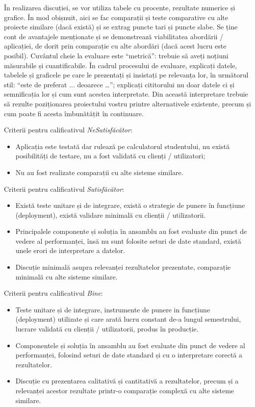 \documentclass[12pt,a4paper]{report}
\newcommand{\worktype}[1]{[\textit{#1}] }
\newcommand{\dezvoltare}{\worktype{Dezvoltare de produs}}
\newcommand{\cercetare}{\worktype{Cercetare}}
\newcommand{\ambele}{\worktype{Ambele}}
\begin{document}
În realizarea discuției, se vor utiliza tabele cu procente, rezultate numerice și grafice. În mod obișnuit, aici se fac comparații și teste comparative cu alte proiecte similare (dacă există) și se extrag puncte tari și puncte slabe. Se ține cont de avantajele menționate și se demonstrează viabilitatea abordării / aplicației, de dorit prin comparație cu alte abordări (dacă acest lucru este posibil). Cuvântul cheie la evaluare este ``metrică'': trebuie să aveți noțiuni măsurabile și cuantificabile. În cadrul procesului de evaluare, explicați datele, tabelele și graficele pe care le prezentați și insistați pe relevanța lor, în următorul stil: ``este de preferat ... deoarece …''; explicați cititorului nu doar datele ci și semnificația lor și cum sunt acestea interpretate. Din această interpretare trebuie să rezulte poziționarea proiectului vostru printre alternativele existente, precum și cum poate fi acesta îmbunătățit în continuare.

Criterii pentru calificativul \textit{Ne\textit{Satisfăcător}}: 
\begin{itemize}
	\item Aplicația este testată dar rulează pe calculatorul studentului, nu există posibilități de testare, nu a fost validată cu clienți / utilizatori;
	\item Nu au fost realizate comparații cu alte sisteme similare.
\end{itemize}

Criterii pentru calificativul \textit{Satisfăcător}: 
\begin{itemize}
	\item \dezvoltare  Există teste unitare și de integrare, există o strategie de punere în funcțiune (deployment), există validare minimală cu clienții / utilizatorii.
	\item \cercetare Principalele componente și soluția în ansamblu au fost evaluate din punct de vedere al performanței, însă nu sunt folosite seturi de date standard, există unele erori de interpretare a datelor.
	\item \ambele Discuție minimală asupra relevanței rezultatelor prezentate, comparație minimală cu alte sisteme similare.
\end{itemize}

Criterii pentru calificativul \textit{Bine}: 
\begin{itemize}
	\item \dezvoltare Teste unitare și de integrare, instrumente de punere in funcțiune (deployment) utilizate și care arată lucru constant de-a lungul semestrului, lucrare validată cu clienții / utilizatorii, produs în producție.
	\item \cercetare Componentele și soluția în ansamblu au fost evaluate din punct de vedere al performanței, folosind seturi de date standard și cu o interpretare corectă a rezultatelor.
	\item \ambele Discuție cu prezentarea calitativă și cantitativă a rezultatelor, precum și a relevanței acestor rezultate printr-o comparație complexă cu alte sisteme similare.
\end{itemize}
\end{document}
